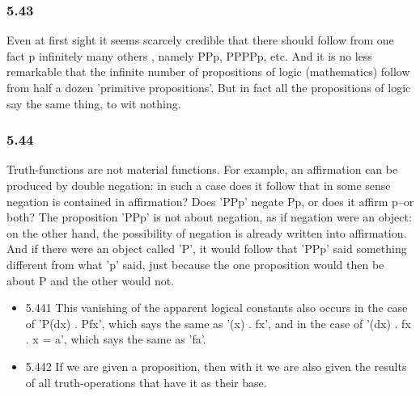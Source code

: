 \documentclass[11pt]{article}
\begin{document}
\subsubsection*{5.43}
\label{sec:org617a7fe}
Even at first sight it seems scarcely credible that there should
follow from one fact p infinitely many others , namely PPp, PPPPp, etc. And
it is no less remarkable that the infinite number of propositions of logic
(mathematics) follow from half a dozen 'primitive propositions'. But in
fact all the propositions of logic say the same thing, to wit nothing.
\subsubsection*{5.44}
\label{sec:org2857fe7}
Truth-functions are not material functions. For example, an
affirmation can be produced by double negation: in such a case does it
follow that in some sense negation is contained in affirmation? Does 'PPp'
negate Pp, or does it affirm p--or both? The proposition 'PPp' is not about
negation, as if negation were an object: on the other hand, the possibility
of negation is already written into affirmation. And if there were an
object called 'P', it would follow that 'PPp' said something different from
what 'p' said, just because the one proposition would then be about P and
the other would not.
\begin{itemize}
\item 5.441
\label{sec:org0dce1ed}
This vanishing of the apparent logical constants also occurs in the
case of 'P(dx) . Pfx', which says the same as '(x) . fx', and in the case
of '(dx) . fx . x = a', which says the same as 'fa'.
\item 5.442
\label{sec:org7f14565}
If we are given a proposition, then with it we are also given the
results of all truth-operations that have it as their base.
\end{itemize}
\end{document}
